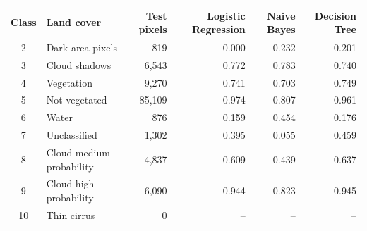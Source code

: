 \begin{tabular}{clrrrr}
\toprule
Class & Land cover & Test pixels & Logistic Regression & Naive Bayes & Decision Tree \\
\midrule
2 & Dark area pixels & 819 & 0.000 & 0.232 & 0.201 \\
3 & Cloud shadows & 6,543 & 0.772 & 0.783 & 0.740 \\
4 & Vegetation & 9,270 & 0.741 & 0.703 & 0.749 \\
5 & Not vegetated & 85,109 & 0.974 & 0.807 & 0.961 \\
6 & Water & 876 & 0.159 & 0.454 & 0.176 \\
7 & Unclassified & 1,302 & 0.395 & 0.055 & 0.459 \\
8 & Cloud medium probability & 4,837 & 0.609 & 0.439 & 0.637 \\
9 & Cloud high probability & 6,090 & 0.944 & 0.823 & 0.945 \\
10 & Thin cirrus & 0 & -- & -- & -- \\
\bottomrule
\end{tabular}
